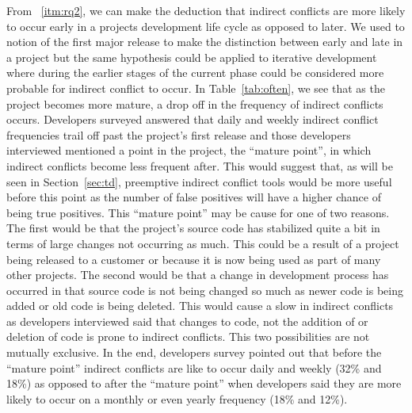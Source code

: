 \documentclass[conference]{IEEEtran}
\begin{document}
From ~\ref{itm:rq2}, we can make the deduction that indirect conflicts are more likely to occur early in a projects development life cycle as opposed
to later. We used to notion of the first major release to make the distinction between early and late in a project but the same hypothesis
could be applied to iterative development where during the earlier stages of the current phase could be considered more probable for indirect
conflict to occur. In Table~\ref{tab:often}, we see that as the project becomes more mature, a drop off in the frequency of indirect
conflicts occurs. Developers surveyed answered that daily and weekly indirect conflict frequencies trail off past the project's first release and 
those developers interviewed mentioned a point in the project, the ``mature point'', in which indirect conflicts become less frequent after.
This would suggest that, as will be seen in Section~\ref{sec:td}, preemptive indirect conflict tools would be more useful before this point as the
number of false positives will have a higher chance of being true positives. This ``mature point'' may be cause for one of two reasons. The
first would be that the project's source code has stabilized quite a bit in terms of large changes not occurring as much. This could be a result
of a project being released to a customer or because it is now being used as part of many other projects. The second would be that a change in
development process has occurred in that source code is not being changed so much as newer code is being added or old code is being deleted. This
would cause a slow in indirect conflicts as developers interviewed said that changes to code, not the addition of or deletion of code is prone
to indirect conflicts. This two possibilities are not mutually exclusive. In the end, developers survey pointed out that before the ``mature
point'' indirect conflicts are like to occur daily and weekly (32\% and 18\%) as opposed to after the ``mature point'' when developers
said they are more likely to occur on a monthly or even yearly frequency (18\% and 12\%).
\end{document}
